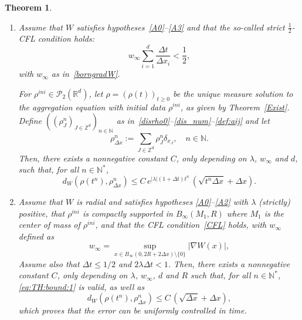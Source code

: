 \documentclass[11pt]{article}
\newtheorem{theo}{Theorem}[section]
\theoremstyle{definition}
\numberwithin{equation}{section}
\newcommand*\NN{\mathbb{N}}
\newcommand*\RR{\mathbb{R}}
\newcommand*\ZZ{\mathbb{Z}}
\newcommand*\calP{{\mathcal P}}
\newcommand*{\romanenumi}{}%
\begin{document}
\begin{theo}\label{TH}\ 
\begin{enumerate}\romanenumi
\item \label{2.2.1} Assume that $W$ satisfies hypotheses~\eqref{A0}--\eqref{A3} and that the so-called strict $\frac 12$-CFL condition holds:
\begin{equation}\label{CFL}
w_\infty \sum_{i=1}^d \frac{\Delta t}{\Delta x_i} < \frac 12,
\end{equation}
with $w_{\infty}$ as in~\eqref{borngradW}.

For $\rho^{ini} \in \calP_2(\RR^d)$, let $\rho=(\rho(t))_{t \ge 0}$ be the unique measure solution to the aggregation equation with initial data $\rho^{ini}$, as given by Theorem~\ref{Exist}. Define $((\rho_J^n)_{J\in \ZZ^d})_{n \in {\mathbb N}}$ as in~\eqref{disrho0}--\eqref{dis_num}--\eqref{def:aij} and let
\[
\rho_{\Delta x}^n := \sum_{J\in \ZZ^d} \rho_J^n \delta_{x_J},
\quad n \in {\mathbb N}.
\]
Then, there exists a nonnegative constant $C$, only depending on $\lambda$, $w_{\infty}$ and $d$, such that, for all $n\in \NN^*$,
\begin{equation}\label{eq:TH:bound:1}
d_W(\rho(t^n),\rho_{\Delta x}^n) \leq C \, e^{\vert \lambda \vert (1+\Delta t)t^n} \, (\sqrt{t^n \Delta x} + \Delta x ).
\end{equation}

\item \label{2.2.2} Assume that $W$ is radial and satisfies hypotheses
\eqref{A0}--\eqref{A2} with $\lambda$ (strictly) positive, that $\rho^{ini}$ is compactly supported in $B_\infty(M_1,R)$ where $M_1$ is the center of mass of $\rho^{ini}$, and that the CFL condition~\eqref{CFL} holds, with $w_{\infty}$ defined as
\begin{equation}\label{borngradW:lambda>0}
w_{\infty} = \sup_{x \in B_{\infty}(0,2R+2\Delta x) \setminus \{0\} } \vert \nabla W(x) \vert,
\end{equation}
Assume also that $\Delta t \leq 1/2$ and $2 \lambda \Delta t < 1$. Then, there exists a nonnegative constant $C$, only depending on $\lambda$, $w_{\infty}$, $d$ and $R$ such that, for all $n\in \NN^*$, \eqref{eq:TH:bound:1} is valid, as well as
\begin{equation}\label{eq:TH:bound:2}
d_W(\rho(t^n),\rho_{\Delta x}^n) \leq C \,
(\sqrt{\Delta x} + \Delta x ),
\end{equation}
which proves that the error can be uniformly controlled in time.
\end{enumerate}
\end{theo}
\end{document}
